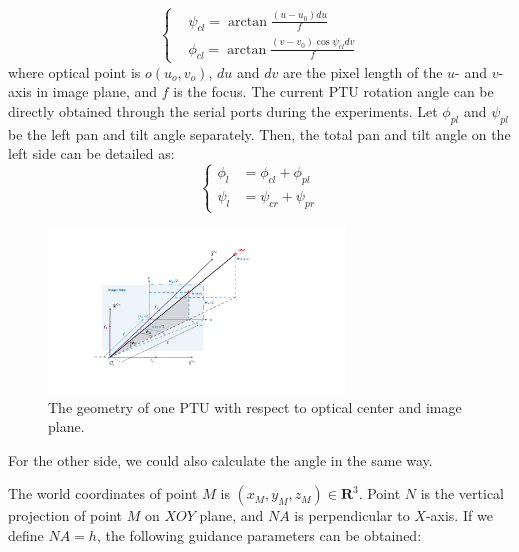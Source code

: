 \begin{equation} 
\left \{
	\begin{split}
		& \psi_{cl} = \arctan \frac{(u-u_0)du}{f} \\
		& \phi_{cl} = \arctan \frac{(v-v_0)\cos\psi_{cl}dv}{f} 
	\end{split}
\right.
\end{equation}
where optical point is $o(u_o,v_o)$, $du$ and $dv$ are the pixel length of the $u$- and $v$-axis in image plane, and $f$ is the focus. The current PTU rotation angle can be directly obtained through the serial ports during the experiments. Let $\phi_{pl}$ and $\psi_{pl}$ be the left pan and tilt angle separately. Then, the total pan and tilt angle on the left side can be detailed as:
\begin{equation} 
\left \{
	\begin{split}
	    \phi_l &= \phi_{cl} + \phi_{pl} \\ 
	    \psi_l &= \psi_{cr} + \psi_{pr}
	\end{split}
\right.
\end{equation}

\begin{figure}[!th]
	\centering
	\includegraphics[width=0.7\textwidth]{Figs/chp03_vision_02_image_plane.pdf}
	\caption{The geometry of one PTU with respect to optical center and image plane.}
	\label{fig:Fig02_ImagePlaneOnly}
\end{figure}


For the other side, we could also calculate the angle in the same way.

The world coordinates of point ${M}$ is $(x_M, y_M, z_M)\in \textbf{R}^3 $. Point $N$ is the vertical projection of point $M$ on $XOY$ plane, and $NA$ is perpendicular to $X$-axis. If we define $NA = h$, the following guidance parameters can be obtained:

